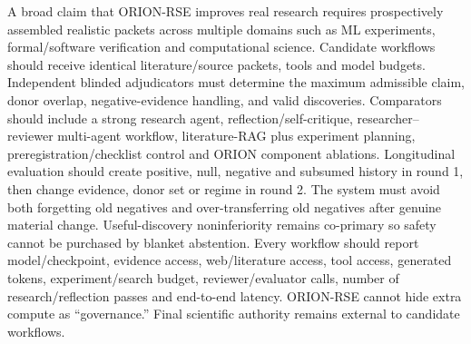 \markdownRendererDocumentBegin
\markdownRendererSectionBegin
{}\markdownRendererInterblockSeparator
{}A broad claim that ORION-RSE improves real research requires prospectively assembled realistic packets across multiple domains such as ML experiments, formal/software verification and computational science. Candidate workflows should receive identical literature/source packets, tools and model budgets. Independent blinded adjudicators must determine the maximum admissible claim, donor overlap, negative-evidence handling,  and valid discoveries.\markdownRendererInterblockSeparator
{}Comparators should include a strong research agent, reflection/self-critique, researcher–reviewer multi-agent workflow, literature-RAG plus experiment planning, preregistration/checklist control and ORION component ablations.\markdownRendererInterblockSeparator
{}Longitudinal evaluation should create positive, null, negative and subsumed history in round 1, then change evidence, donor set or regime in round 2. The system must avoid both forgetting old negatives and over-transferring old negatives after genuine material change. Useful-discovery noninferiority remains co-primary so safety cannot be purchased by blanket abstention.\markdownRendererInterblockSeparator
{}Every workflow should report model/checkpoint, evidence access, web/literature access, tool access, generated tokens, experiment/search budget, reviewer/evaluator calls, number of research/reflection passes and end-to-end latency. ORION-RSE cannot hide extra compute as “governance.” Final scientific authority remains external to candidate workflows.
\markdownRendererSectionEnd \markdownRendererDocumentEnd